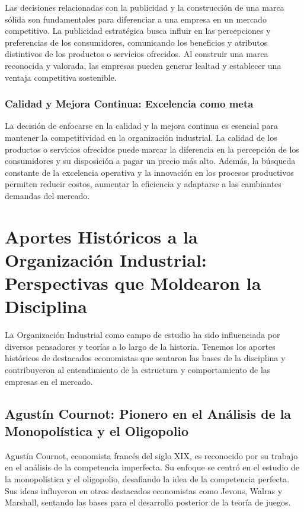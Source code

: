 \documentclass[
  doc,
  floatsintext,
  longtable,
  a4paper,
  nolmodern,
  notxfonts,
  notimes,
  colorlinks=true,linkcolor=blue,citecolor=blue,urlcolor=blue]{apa7}
\begin{document}
Las decisiones relacionadas con la publicidad y la construcción de una
marca sólida son fundamentales para diferenciar a una empresa en un
mercado competitivo. La publicidad estratégica busca influir en las
percepciones y preferencias de los consumidores, comunicando los
beneficios y atributos distintivos de los productos o servicios
ofrecidos. Al construir una marca reconocida y valorada, las empresas
pueden generar lealtad y establecer una ventaja competitiva sostenible.

\subsubsection{Calidad y Mejora Continua: Excelencia como
meta}\label{calidad-y-mejora-continua-excelencia-como-meta}

La decisión de enfocarse en la calidad y la mejora continua es esencial
para mantener la competitividad en la organización industrial. La
calidad de los productos o servicios ofrecidos puede marcar la
diferencia en la percepción de los consumidores y su disposición a pagar
un precio más alto. Además, la búsqueda constante de la excelencia
operativa y la innovación en los procesos productivos permiten reducir
costos, aumentar la eficiencia y adaptarse a las cambiantes demandas del
mercado.

\section{Aportes Históricos a la Organización Industrial: Perspectivas
que Moldearon la
Disciplina}\label{aportes-histuxf3ricos-a-la-organizaciuxf3n-industrial-perspectivas-que-moldearon-la-disciplina}

La Organización Industrial como campo de estudio ha sido influenciada
por diversos pensadores y teorías a lo largo de la historia. Tenemos los
aportes históricos de destacados economistas que sentaron las bases de
la disciplina y contribuyeron al entendimiento de la estructura y
comportamiento de las empresas en el mercado.

\subsection{Agustín Cournot: Pionero en el Análisis de la Monopolística
y el
Oligopolio}\label{agustuxedn-cournot-pionero-en-el-anuxe1lisis-de-la-monopoluxedstica-y-el-oligopolio}

Agustín Cournot, economista francés del siglo XIX, es reconocido por su
trabajo en el análisis de la competencia imperfecta. Su enfoque se
centró en el estudio de la monopolística y el oligopolio, desafiando la
idea de la competencia perfecta. Sus ideas influyeron en otros
destacados economistas como Jevons, Walras y Marshall, sentando las
bases para el desarrollo posterior de la teoría de juegos.
\end{document}
